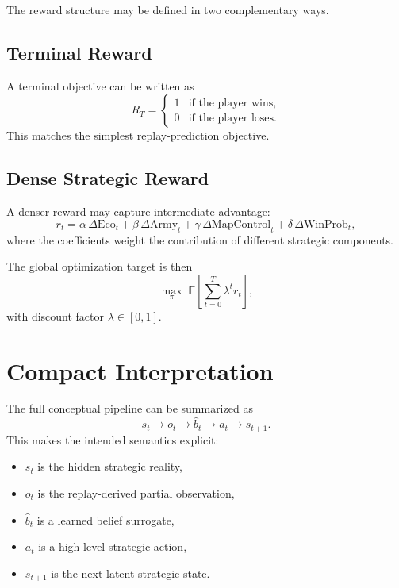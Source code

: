 \documentclass[11pt,a4paper]{article}
\begin{document}
The reward structure may be defined in two complementary ways.

\subsection{Terminal Reward}
A terminal objective can be written as
\[
R_T =
\begin{cases}
1 & \text{if the player wins,}\\
0 & \text{if the player loses.}
\end{cases}
\]
This matches the simplest replay-prediction objective.

\subsection{Dense Strategic Reward}
A denser reward may capture intermediate advantage:
\[
r_t = \alpha\,\Delta \mathrm{Eco}_t + \beta\,\Delta \mathrm{Army}_t + \gamma\,\Delta \mathrm{MapControl}_t + \delta\,\Delta \mathrm{WinProb}_t,
\]
where the coefficients weight the contribution of different strategic components.

The global optimization target is then
\[
\max_{\pi} \; \mathbb{E}\left[\sum_{t=0}^{T} \lambda^t r_t\right],
\]
with discount factor $\lambda \in [0,1]$.

\section{Compact Interpretation}
The full conceptual pipeline can be summarized as
\[
s_t \longrightarrow o_t \longrightarrow \hat{b}_t \longrightarrow a_t \longrightarrow s_{t+1}.
\]
This makes the intended semantics explicit:
\begin{itemize}[leftmargin=1.8em]
    \item $s_t$ is the hidden strategic reality,
    \item $o_t$ is the replay-derived partial observation,
    \item $\hat{b}_t$ is a learned belief surrogate,
    \item $a_t$ is a high-level strategic action,
    \item $s_{t+1}$ is the next latent strategic state.
\end{itemize}
\end{document}

